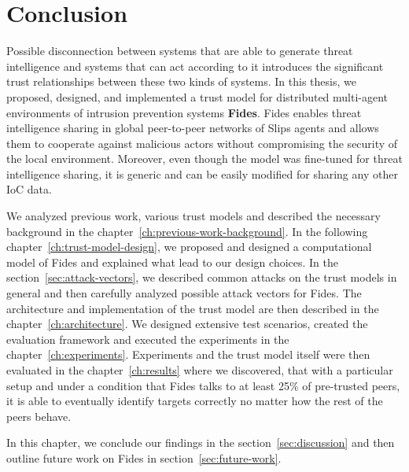 \chapter{Conclusion}
\label{ch:conclusion}

Possible disconnection between systems that are able to generate threat intelligence and systems that can act according to it introduces the significant trust relationships between these two kinds of systems.
In this thesis, we proposed, designed, and implemented a trust model for distributed multi-agent environments of intrusion prevention systems \textbf{Fides}.
Fides enables threat intelligence sharing in global peer-to-peer networks of Slips agents and allows them to cooperate against malicious actors without compromising the security of the local environment. 
Moreover, even though the model was fine-tuned for threat intelligence sharing, it is generic and can be easily modified for sharing any other IoC data.

We analyzed previous work, various trust models and described the necessary background in the chapter~\ref{ch:previous-work-background}.
In the following chapter~\ref{ch:trust-model-design}, we proposed and designed a computational model of Fides and explained what lead to our design choices.
In the section~\ref{sec:attack-vectors}, we described common attacks on the trust models in general and then carefully analyzed possible attack vectors for Fides.
The architecture and implementation of the trust model are then described in the chapter~\ref{ch:architecture}.
We designed extensive test scenarios, created the evaluation framework and executed the experiments in the chapter~\ref{ch:experiments}.
Experiments and the trust model itself were then evaluated in the chapter~\ref{ch:results} where we discovered, that with a particular setup and under a condition that Fides talks to at least 25\% of pre-trusted peers, it is able to eventually identify targets correctly no matter how the rest of the peers behave.

In this chapter, we conclude our findings in the section~\ref{sec:discussion} and then outline future work on Fides in section~\ref{sec:future-work}.




